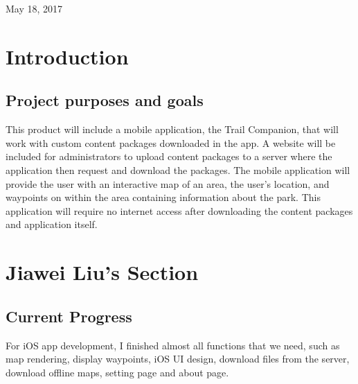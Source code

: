 \documentclass[letterpaper, 10pt,titlepage]{article}
\begin{document}
\begin{titlepage}
    \vspace{0.8cm}
    \vfill
    
\begin{center}    
    May 18, 2017

\end{center}
\end{titlepage}


\tableofcontents
\newpage



\section{Introduction}
\subsection{Project purposes and goals}
This product will include a mobile application, the Trail Companion, that will work with custom content packages downloaded in the app. A website will be included for administrators to upload content packages to a server where the application then request and download the packages. The mobile application will provide the user with an interactive map of an area, the user’s location, and waypoints on within the area containing information about the park. This application will require no internet access after downloading the content packages and application itself.





\vspace{0.3cm}




\section{Jiawei Liu's Section}

\subsection{Current Progress}
For iOS app development, I finished almost all functions that we need, such as map rendering, display waypoints, iOS UI design, download files from the server, download offline maps, setting page and about page. 
\end{document}
